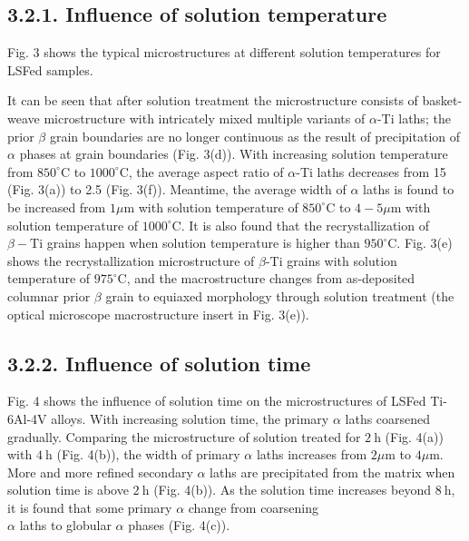 \documentclass[10pt]{article}
\begin{document}
\subsection*{3.2.1. Influence of solution temperature}
Fig. 3 shows the typical microstructures at different solution temperatures for LSFed samples.

It can be seen that after solution treatment the microstructure consists of basket-weave microstructure with intricately mixed multiple variants of $\alpha$-Ti laths; the prior $\beta$ grain boundaries are no longer continuous as the result of precipitation of $\alpha$ phases at grain boundaries (Fig. 3(d)). With increasing solution temperature from $850^{\circ} \mathrm{C}$ to $1000^{\circ} \mathrm{C}$, the average aspect ratio of $\alpha$-Ti laths decreases from 15 (Fig. 3(a)) to 2.5 (Fig. 3(f)). Meantime, the average width of $\alpha$ laths is found to be increased from $1 \mu \mathrm{m}$ with solution temperature of $850^{\circ} \mathrm{C}$ to $4-5 \mu \mathrm{m}$ with solution temperature of $1000^{\circ} \mathrm{C}$. It is also found that the recrystallization of $\beta-\mathrm{Ti}$ grains happen when solution temperature is higher than $950^{\circ} \mathrm{C}$. Fig. 3(e) shows the recrystallization microstructure of $\beta$-Ti grains with solution temperature of $975^{\circ} \mathrm{C}$, and the macrostructure changes from as-deposited columnar prior $\beta$ grain to equiaxed morphology through solution treatment (the optical microscope macrostructure insert in Fig. 3(e)).

\subsection*{3.2.2. Influence of solution time}
Fig. 4 shows the influence of solution time on the microstructures of LSFed Ti-6Al-4V alloys. With increasing solution time, the primary $\alpha$ laths coarsened gradually. Comparing the microstructure of solution treated for $2 \mathrm{~h}$ (Fig. 4(a)) with $4 \mathrm{~h}$ (Fig. 4(b)), the width of primary $\alpha$ laths increases from $2 \mu \mathrm{m}$ to $4 \mu \mathrm{m}$. More and more refined secondary $\alpha$ laths are precipitated from the matrix when solution time is above $2 \mathrm{~h}$ (Fig. 4(b)). As the solution time increases beyond $8 \mathrm{~h}$, it is found that some primary $\alpha$ change from coarsening\\
$\alpha$ laths to globular $\alpha$ phases (Fig. 4(c)).
\end{document}
